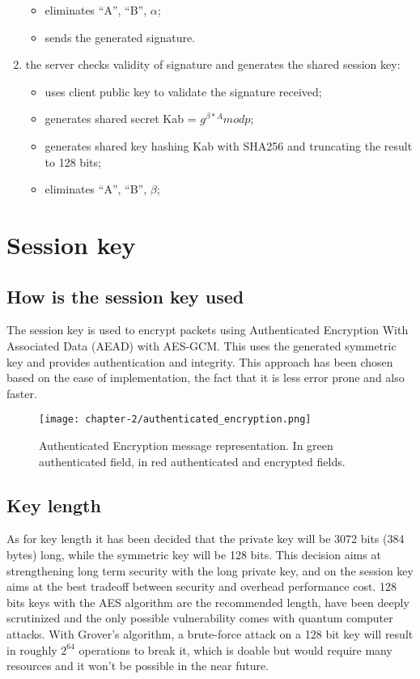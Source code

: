 \begin{enumerate}
\begin{itemize}
		\item eliminates ``A'', ``B'', \(\alpha\);
		\item sends the generated signature. 
	\end{itemize}
	\item the server checks validity of signature and generates the shared session key:
	\begin{itemize}
		\item uses client public key to validate the signature received;
		\item generates shared secret Kab = \(g^{\beta*A} mod p\);
		\item generates shared key hashing Kab with SHA256 and truncating the result to 128 bits;
		\item eliminates ``A'', ``B'', \(\beta\);
	\end{itemize}	 
\end{enumerate}

\newpage{}
\section{Session key}

\subsection{How is the session key used}

The session key is used to encrypt packets using Authenticated Encryption With Associated Data (AEAD) with AES-GCM. This uses the generated symmetric key and provides authentication and integrity. This approach has been chosen based on the ease of implementation, the fact that it is less error prone and also faster. 

\begin{figure}[!h] 
    \centering 
    \texttt{[image: chapter-2/authenticated\_encryption.png]} 
    \caption{Authenticated Encryption message representation. In green authenticated field, in red authenticated and encrypted fields.}
    \label{fig:authenticated_encryption}
\end{figure}

\subsection{Key length}

As for key length it has been decided that the private key will be 3072 bits (384 bytes) long, while the symmetric key will be 128 bits. This decision aims at strengthening long term security with the long private key, and on the session key aims at the best tradeoff between security and overhead performance cost. 128 bits keys with the AES algorithm are the recommended length, have been deeply scrutinized and the only possible vulnerability comes with quantum computer attacks. With Grover's algorithm, a brute-force attack on a 128 bit key will result in roughly \(2^{64}\) operations to break it, which is doable but would require many resources and it won’t be possible in the near future.

